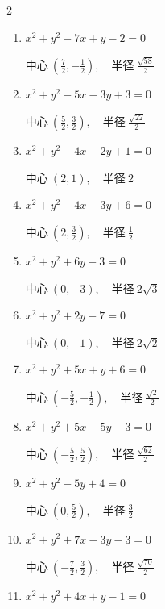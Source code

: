 \begin{multicols}{2}
\begin{enumerate}
  \item $x^{2}+y^{2}-7x+y-2=0$

        $\displaystyle 中心\: \left(\frac{7}{2},-\frac{1}{2}\right), \quad 半径 \ \frac{\sqrt{58}}{2}$

  \item $x^{2}+y^{2}-5x-3y+3=0$

        $\displaystyle 中心\: \left(\frac{5}{2},\frac{3}{2}\right), \quad 半径 \ \frac{\sqrt{22}}{2}$

  \item $x^{2}+y^{2}-4x-2y+1=0$

        $\displaystyle 中心\: \left(2,1\right), \quad 半径 \ 2$

  \item $x^{2}+y^{2}-4x-3y+6=0$

        $\displaystyle 中心\: \left(2,\frac{3}{2}\right), \quad 半径 \ \frac{1}{2}$

  \item $x^{2}+y^{2}+6y-3=0$

        $\displaystyle 中心\: \left(0,-3\right), \quad 半径 \ 2\sqrt{3}$

  \item $x^{2}+y^{2}+2y-7=0$

        $\displaystyle 中心\: \left(0,-1\right), \quad 半径 \ 2\sqrt{2}$

\columnbreak %

\resetques

  \item $x^{2}+y^{2}+5x+y+6=0$

        $\displaystyle 中心\: \left(-\frac{5}{2},-\frac{1}{2}\right), \quad 半径 \ \frac{\sqrt{2}}{2}$

  \item $x^{2}+y^{2}+5x-5y-3=0$

        $\displaystyle 中心\: \left(-\frac{5}{2},\frac{5}{2}\right), \quad 半径 \ \frac{\sqrt{62}}{2}$

  \item $x^{2}+y^{2}-5y+4=0$

        $\displaystyle 中心\: \left(0,\frac{5}{2}\right), \quad 半径 \ \frac{3}{2}$

  \item $x^{2}+y^{2}+7x-3y-3=0$

        $\displaystyle 中心\: \left(-\frac{7}{2},\frac{3}{2}\right), \quad 半径 \ \frac{\sqrt{70}}{2}$

  \item $x^{2}+y^{2}+4x+y-1=0$


\end{enumerate}
\end{multicols}
